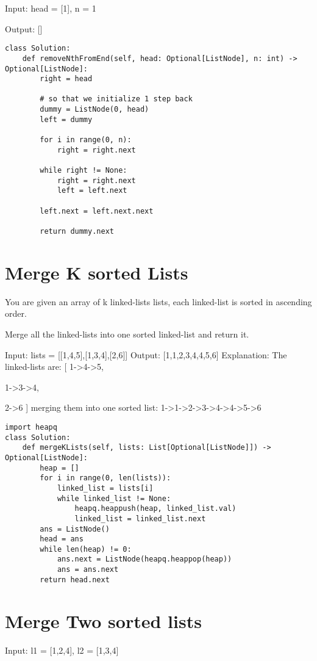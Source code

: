 \documentclass[24pt, a4]{article}
\begin{document}
Input: head = [1], n = 1

Output: []
\begin{lstlisting}
class Solution:
    def removeNthFromEnd(self, head: Optional[ListNode], n: int) -> Optional[ListNode]:
        right = head
        
        # so that we initialize 1 step back
        dummy = ListNode(0, head)
        left = dummy
        
        for i in range(0, n):
            right = right.next
            
        while right != None:
            right = right.next
            left = left.next
        
        left.next = left.next.next
        
        return dummy.next
\end{lstlisting}

\section{Merge K sorted Lists}

You are given an array of k linked-lists lists, each linked-list is sorted in ascending order.

Merge all the linked-lists into one sorted linked-list and return it.

Input: lists = [[1,4,5],[1,3,4],[2,6]]
Output: [1,1,2,3,4,4,5,6]
Explanation: The linked-lists are:
[
  1->4->5,

  1->3->4,
  
  2->6
]
merging them into one sorted list:
1->1->2->3->4->4->5->6

\begin{lstlisting}
import heapq
class Solution:
    def mergeKLists(self, lists: List[Optional[ListNode]]) -> Optional[ListNode]:
        heap = []
        for i in range(0, len(lists)):
            linked_list = lists[i]
            while linked_list != None:
                heapq.heappush(heap, linked_list.val)
                linked_list = linked_list.next 
        ans = ListNode()
        head = ans
        while len(heap) != 0:
            ans.next = ListNode(heapq.heappop(heap))
            ans = ans.next
        return head.next
\end{lstlisting}

\section{Merge Two sorted lists}
Input: l1 = [1,2,4], l2 = [1,3,4]
\end{document}
